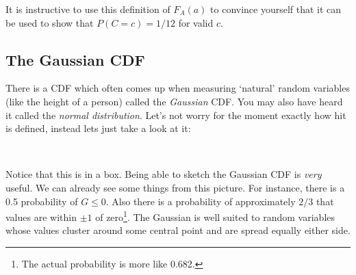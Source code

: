 \documentclass[a4paper]{article}
\begin{document}
It is instructive to use this definition of $F_A(a)$ to convince yourself
that it can be used to show that $P(C=c) = 1/12$ for valid $c$.

\subsection{The Gaussian CDF}

There is a CDF which often comes up when measuring `natural' random variables
(like the height of a person) called the \emph{Gaussian} CDF. You may also have
heard it called the \emph{normal distribution}. Let's not worry for the moment
exactly how hit is defined, instead lets just take a look at it:

{\center
{} \\ \null
}

Notice that this is in a box. Being able to sketch the Gaussian CDF is
\emph{very} useful. We can already see some things from this picture. For
instance, there is a 0.5 probability of $G \le 0$. Also there is a probability
of approximately $2/3$ that values are within $\pm 1$ of zero\footnote{The
actual probability is more like 0.682.}. The Gaussian is well suited to random
variables whose values cluster around some central point and are spread equally
either side.
\end{document}
